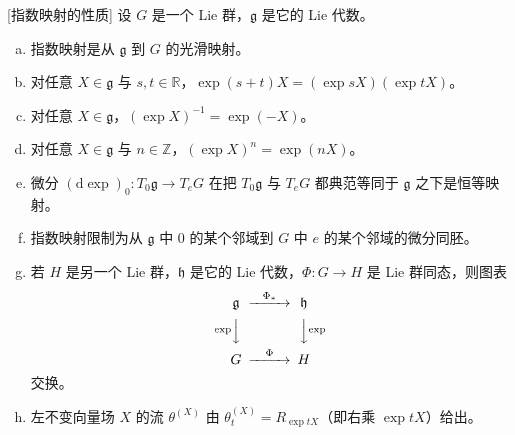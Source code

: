 \documentclass[../../main.tex]{subfiles}
\begin{document}
\begin{proposition}{[指数映射的性质]}\label{proposition:ch20-指数性质}
设 $G$ 是一个 Lie 群，$\mathfrak g$ 是它的 Lie 代数。
\begin{enumerate}[(a)]
\item 指数映射是从 $\mathfrak g$ 到 $G$ 的光滑映射。
\item 对任意 $X\in\mathfrak g$ 与 $s,t\in\mathbb{R}$，$\exp(s+t)X=(\exp sX)(\exp tX)$。
\item 对任意 $X\in\mathfrak g$，$(\exp X)^{-1}=\exp(-X)$。
\item 对任意 $X\in\mathfrak g$ 与 $n\in\mathbb{Z}$，$(\exp X)^n=\exp(nX)$。
\item 微分 $(\mathrm{d}\exp)_0\colon T_0\mathfrak g\to T_eG$ 在把 $T_0\mathfrak g$ 与 $T_eG$ 都典范等同于 $\mathfrak g$ 之下是恒等映射。
\item 指数映射限制为从 $\mathfrak g$ 中 $0$ 的某个邻域到 $G$ 中 $e$ 的某个邻域的微分同胚。
\item 若 $H$ 是另一个 Lie 群，$\mathfrak h$ 是它的 Lie 代数，$\Phi\colon G\to H$ 是 Lie 群同态，则图表
\begin{align*}
\begin{CD}
\mathfrak g @>{\Phi_*}>> \mathfrak h\\
@V{\exp}VV @VV{\exp}V\\
G @>{\Phi}>> H
\end{CD}
\end{align*}
交换。
\item 左不变向量场 $X$ 的流 $\theta^{(X)}$ 由 $\theta^{(X)}_t=R_{\exp tX}$（即右乘 $\exp tX$）给出。
\end{enumerate}
\end{proposition}
\end{document}
